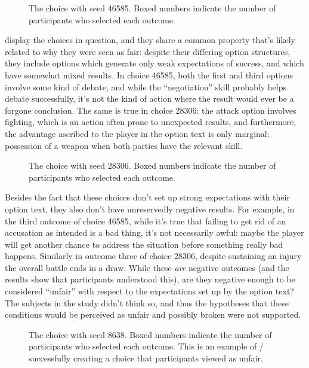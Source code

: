 \begin{figure}[!b]
\caption[``Unexpected failure'' choice 46585]{The \unxf{} choice with seed 46585. Boxed numbers indicate the number of participants who selected each outcome.}
\label{fig:e2-seed-46585}
\end{figure}


 display the choices in question, and they share a common property that's likely related to why they were seen as fair: despite their differing option structures, they include options which generate only weak expectations of success, and which have somewhat mixed results.
%
In choice 46585, both the first and third options involve some kind of debate, and while the ``negotiation'' skill probably helps debate successfully, it's not the kind of action where the result would ever be a forgone conclusion.
%
The same is true in choice 28306: the attack option involves fighting, which is an action often prone to unexpected results, and furthermore, the advantage ascribed to the player in the option text is only marginal: possession of a weapon when both parties have the relevant skill.

\begin{figure}[t]
\caption[``Obvious failure'' choice 28306]{The \obvf{} choice with seed 28306. Boxed numbers indicate the number of participants who selected each outcome.}
\label{fig:e2-seed-28306}
\end{figure}


Besides the fact that these choices don't set up strong expectations with their option text, they also don't have unreservedly negative results.
%
For example, in the third outcome of choice 46585, while it's true that failing to get rid of an accusation as intended is a bad thing, it's not necessarily awful: maybe the player will get another chance to address the situation before something really bad happens.
%
Similarly in outcome three of choice 28306, despite sustaining an injury the overall battle ends in a draw.
%
While these \emph{are} negative outcomes (and the results show that participants understood this), are they negative enough to be considered ``unfair'' with respect to the expectations set up by the option text?
%
The subjects in the study didn't think so, and thus the hypotheses that these conditions would be perceived as unfair and possibly broken were not supported.

\begin{figure}[!t]
\caption[``Obvious failure'' choice 8638]{The \obvf{} choice with seed 8638. Boxed numbers indicate the number of participants who selected each outcome. This is an example of \dunyazad/ successfully creating a choice that participants viewed as unfair.}
\label{fig:e2-seed-8638}
\end{figure}


